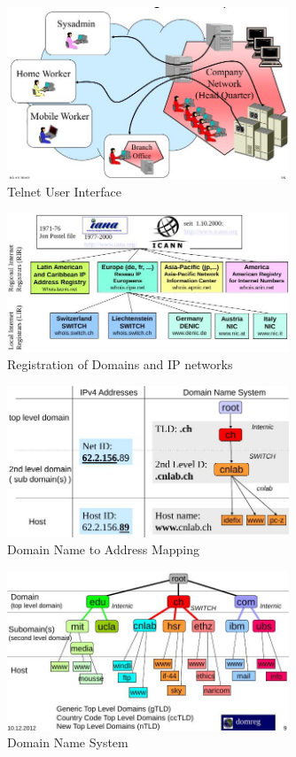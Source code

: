 \documentclass[ngerman,a4paper,12pt]{scrreprt}
\begin{document}
\begin{figure}[H]
	\centering
	\includegraphics[width=0.75\textwidth]{img/V13.8.jpg}
	\caption{Telnet User Interface}
	\label{}
\end{figure}


\begin{figure}[H]
	\centering
	\includegraphics[width=0.75\textwidth]{img/V13.11.jpg}
	\caption{Registration of Domains and IP networks}
	\label{}
\end{figure}

\begin{figure}[H]
	\centering
	\includegraphics[width=0.75\textwidth]{img/V13.12.jpg}
	\caption{Domain Name to Address Mapping}
	\label{}
\end{figure}

\begin{figure}[H]
	\centering
	\includegraphics[width=0.75\textwidth]{img/V13.13.jpg}
	\caption{Domain Name System}
	\label{}
\end{figure}
\end{document}
